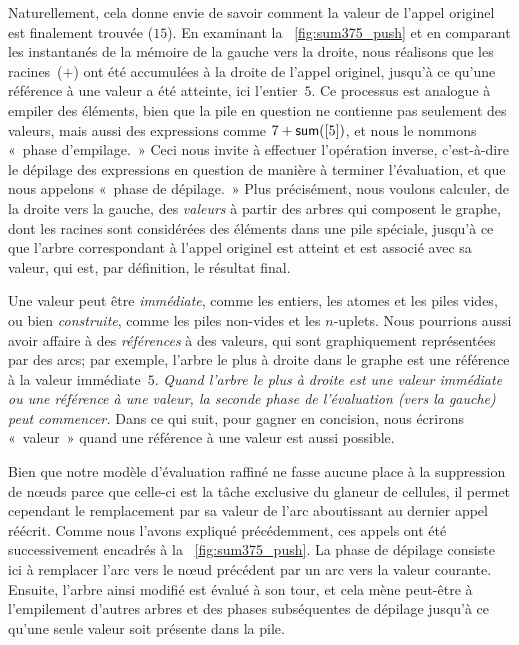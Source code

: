 Naturellement, cela donne envie de savoir comment la valeur de l'appel
originel est finalement trouvée (\(15\)). En examinant la
\fig~\ref{fig:sum375_push} et en comparant les instantanés de la
mémoire de la gauche vers la droite, nous réalisons que les
racines~(\(+\)) ont été accumulées à la droite de l'appel originel,
jusqu'à ce qu'une référence à une valeur a été atteinte, ici
l'entier~\(5\). Ce processus est analogue à empiler des éléments, bien
que la pile en question ne contienne pas seulement des valeurs, mais
aussi des expressions comme \(7 + \textsf{sum}([5])\), et nous le nommons
«~phase d'empilage.~» Ceci nous invite à effectuer l'opération inverse,
c'est-à-dire le dépilage des expressions en question de manière à
terminer l'évaluation, et que nous appelons «~phase de dépilage.~» Plus
précisément, nous voulons calculer, de la droite vers la gauche, des
\emph{valeurs} à partir des arbres qui composent le graphe, dont les
racines sont considérées des éléments dans une pile spéciale, jusqu'à
ce que l'arbre correspondant à l'appel originel est atteint et est
associé avec sa valeur, qui est, par définition, le résultat final.

Une valeur peut être \emph{immédiate}, comme les entiers, les atomes
et les piles vides, ou bien \emph{construite}, comme les piles
non-vides et les \(n\)-uplets. Nous pourrions aussi avoir affaire à
des \emph{références} à des valeurs, qui sont graphiquement
représentées par des arcs; par exemple, l'arbre le plus à droite dans
le graphe est une référence à la valeur immédiate~\(5\). \emph{Quand
  l'arbre le plus à droite est une valeur immédiate ou une référence à
  une valeur, la seconde phase de l'évaluation (vers la gauche) peut
  commencer.} Dans ce qui suit, pour gagner en concision, nous
écrirons «~valeur~» quand une référence à une valeur est aussi possible.

Bien que notre modèle d'évaluation raffiné ne fasse aucune place à la
suppression de n{\oe}uds parce que celle-ci est la tâche exclusive du
glaneur de cellules, il permet cependant le remplacement par sa valeur
de l'arc aboutissant au dernier appel réécrit. Comme nous l'avons
expliqué précédemment, ces appels ont été successivement encadrés à la
\fig~\vref{fig:sum375_push}. La phase de dépilage consiste ici à
remplacer l'arc vers le n{\oe}ud  précédent par un arc vers
la valeur courante. Ensuite, l'arbre ainsi modifié est évalué à son
tour, et cela mène peut-être à l'empilement d'autres arbres et des
phases subséquentes de dépilage jusqu'à ce qu'une seule valeur soit
présente dans la pile.

